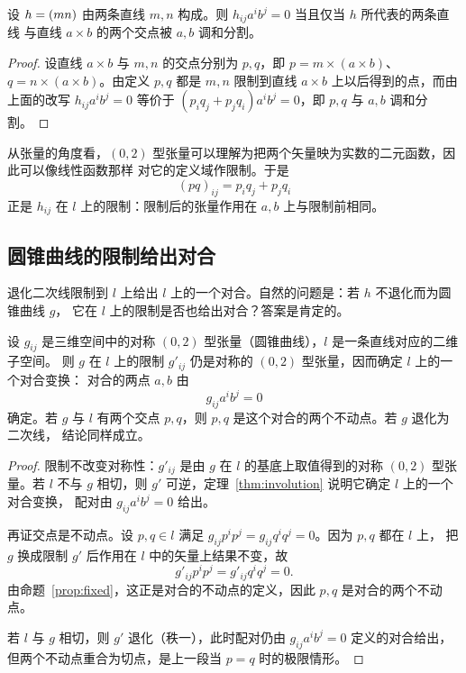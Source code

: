 \begin{proposition}\label{prop:degenerate}
设 $h=(mn)$ 由两条直线 $m,n$ 构成。则 $h_{ij}a^ib^j=0$ 当且仅当 $h$ 所代表的两条直线
与直线 $a\times b$ 的两个交点被 $a,b$ 调和分割。
\end{proposition}

\begin{proof}
设直线 $a\times b$ 与 $m,n$ 的交点分别为 $p,q$，即 $p=m\times(a\times b)$、
$q=n\times(a\times b)$。由定义 $p,q$ 都是 $m,n$ 限制到直线 $a\times b$ 上以后得到的点，而由
上面的改写 $h_{ij}a^ib^j=0$ 等价于 $(p_iq_j+p_jq_i)a^ib^j=0$，即 $p,q$ 与 $a,b$ 调和分割。
\end{proof}

从张量的角度看，$(0,2)$ 型张量可以理解为把两个矢量映为实数的二元函数，因此可以像线性函数那样
对它的定义域作限制。于是
\[
(pq)_{ij}=p_iq_j+p_jq_i
\]
正是 $h_{ij}$ 在 $l$ 上的限制：限制后的张量作用在 $a,b$ 上与限制前相同。

\subsection{圆锥曲线的限制给出对合}

退化二次线限制到 $l$ 上给出 $l$ 上的一个对合。自然的问题是：若 $h$ 不退化而为圆锥曲线 $g$，
它在 $l$ 上的限制是否也给出对合？答案是肯定的。

\begin{theorem}[圆锥曲线在直线上的限制]\label{thm:conic-restrict}
设 $g_{ij}$ 是三维空间中的对称 $(0,2)$ 型张量（圆锥曲线），$l$ 是一条直线对应的二维子空间。
则 $g$ 在 $l$ 上的限制 $g'_{ij}$ 仍是对称的 $(0,2)$ 型张量，因而确定 $l$ 上的一个对合变换：
对合的两点 $a,b$ 由
\[
g_{ij}a^ib^j=0
\]
确定。若 $g$ 与 $l$ 有两个交点 $p,q$，则 $p,q$ 是这个对合的两个不动点。若 $g$ 退化为二次线，
结论同样成立。
\end{theorem}

\begin{proof}
限制不改变对称性：$g'_{ij}$ 是由 $g$ 在 $l$ 的基底上取值得到的对称 $(0,2)$ 型张量。若 $l$ 不与
$g$ 相切，则 $g'$ 可逆，定理~\ref{thm:involution} 说明它确定 $l$ 上的一个对合变换，
配对由 $g_{ij}a^ib^j=0$ 给出。

再证交点是不动点。设 $p,q\in l$ 满足 $g_{ij}p^ip^j=g_{ij}q^iq^j=0$。因为 $p,q$ 都在 $l$ 上，
把 $g$ 换成限制 $g'$ 后作用在 $l$ 中的矢量上结果不变，故
\[
g'_{ij}p^ip^j=g'_{ij}q^iq^j=0 .
\]
由命题~\ref{prop:fixed}，这正是对合的不动点的定义，因此 $p,q$ 是对合的两个不动点。

若 $l$ 与 $g$ 相切，则 $g'$ 退化（秩一），此时配对仍由 $g_{ij}a^ib^j=0$ 定义的对合给出，
但两个不动点重合为切点，是上一段当 $p=q$ 时的极限情形。
\end{proof}

